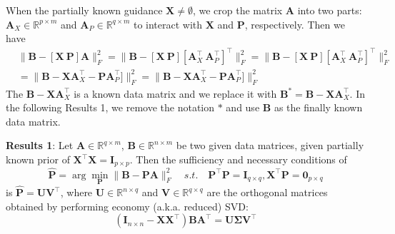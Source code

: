 \documentclass[titlepage,11pt,twoside]{article}
\let\oldemptyset\emptyset
\let\emptyset\varnothing
\begin{document}

When the partially known guidance $\mathbf{X}\neq\oldemptyset$, we crop the matrix $\mathbf{A}$ into two parts: $\mathbf{A}_{X}\in\mathbb{R}^{p\times m}$ and $\mathbf{A}_{P}\in\mathbb{R}^{q\times m}$ to interact with $\mathbf{X}$ and $\mathbf{P}$, respectively. Then we have 
\begin{equation}
\begin{split}
&
\|\mathbf{B}-[\mathbf{X}\ \mathbf{P}]\mathbf{A}\|_{F}^{2}
=\|\mathbf{B}-[\mathbf{X}\ \mathbf{P}][\mathbf{A}_{X}^{\top}\ \mathbf{A}_{P}^{\top}]^{\top}\|_{F}^{2}
=\|\mathbf{B}-[\mathbf{X}\ \mathbf{P}][\mathbf{A}_{X}^{\top}\ \mathbf{A}_{P}^{\top}]^{\top}\|_{F}^{2}
\\
&
=\|\mathbf{B}-\mathbf{X}\mathbf{A}_{X}^{\top} - \mathbf{P}\mathbf{A}_{P}^{\top}]\|_{F}^{2}
=\|\mathbf{B}-\mathbf{X}\mathbf{A}_{X}^{\top} - \mathbf{P}\mathbf{A}_{P}^{\top}]\|_{F}^{2}
\end{split}
\end{equation}
The $\mathbf{B}-\mathbf{X}\mathbf{A}_{X}^{\top}$ is a known data matrix and we replace it with 
$\mathbf{B}^{*}=\mathbf{B}-\mathbf{X}\mathbf{A}_{X}^{\top}$. In the following Results 1, we remove the notation $*$ and use $\mathbf{B}$ as the finally known data matrix.

\textbf{Results 1}: Let $\mathbf{A}\in \mathbb{R}^{q\times m}$, $\mathbf{B}\in \mathbb{R}^{n\times m}$ be two given data matrices, given partially known prior of $\mathbf{X}^{\top}\mathbf{X}=\mathbf{I}_{p\times p}$. Then the sufficiency and necessary conditions of
\begin{equation}
\mathbf{\hat{P}}=\arg\min_{\mathbf{P}}\|\mathbf{B}-\mathbf{P}\mathbf{A}\|_{F}^{2}
\quad
s.t.
\quad
\mathbf{P}^{\top}\mathbf{P} = \mathbf{I}_{q\times q}, \mathbf{X}^{\top}\mathbf{P} = \mathbf{0}_{p\times q} 
\end{equation}
is $\mathbf{\hat{P}} = \mathbf{U}\mathbf{V}^{\top}$, where $\mathbf{U}\in \mathbb{R}^{n\times q}$ and $\mathbf{V}\in \mathbb{R}^{q\times q}$ are the orthogonal matrices obtained by performing economy (a.k.a. reduced) SVD:
\begin{equation}
(\mathbf{I}_{n\times n}-\mathbf{X}\mathbf{X}^{\top})\mathbf{B}\mathbf{A}^{\top} = \mathbf{U}\mathbf{\mathbf{\Sigma}}\mathbf{V}^{\top}
\end{equation}
\end{document}
